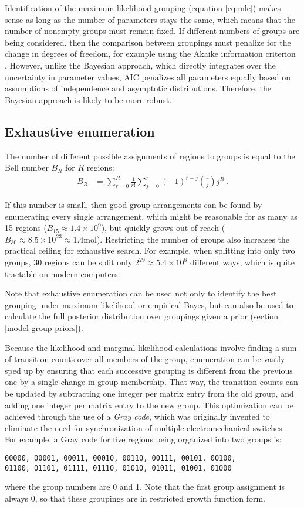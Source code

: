 \documentclass[12pt]{article}
\newcommand{\mol}{\mathrm{mol}}
\begin{document}
Identification of the maximum-likelihood grouping (equation \eqref{eq:mle}) makes sense as long as the number of parameters stays the same, which means that the number of nonempty groups must remain fixed. If different numbers of groups are being considered, then the comparison between groupings must penalize for the change in degrees of freedom, for example using the Akaike information criterion \cite{akaike1974}. However, unlike the Bayesian approach, which directly integrates over the uncertainty in parameter values, AIC penalizes all parameters equally based on assumptions of independence and asymptotic distributions. Therefore, the Bayesian approach is likely to be more robust.

\subsection{Exhaustive enumeration}
\label{enumeration}

The number of different possible assignments of regions to groups is equal to the Bell number $B_R$ for $R$ regions:
\begin{align}
B_R
&=
\sum_{r=0}^R \frac{1}{r!}\sum_{j=0}^{r}(-1)^{r-j} \binom{r}{j} j^R \, .
\end{align}

If this number is small, then good group arrangements can be found by enumerating every single arrangement, which might be reasonable for as many as 15 regions ($B_{15} \approx 1.4 \times 10^9$), but quickly grows out of reach ($B_{30} \approx 8.5 \times 10^{23} \approx 1.4 \mol$). Restricting the number of groups also increases the practical ceiling for exhaustive search. For example, when splitting into only two groups, 30 regions can be split only $2^{29} \approx 5.4 \times 10^8$ different ways, which is quite tractable on modern computers.

Note that exhaustive enumeration can be used not only to identify the best grouping under maximum likelihood or empirical Bayes, but can also be used to calculate the full posterior distribution over groupings given a prior (section \ref{model-group-priors}).

Because the likelihood and marginal likelihood calculations involve finding a sum of transition counts over all members of the group, enumeration can be vastly sped up by ensuring that each successive grouping is different from the previous one by a single change in group membership. That way, the transition counts can be updated by subtracting one integer per matrix entry from the old group, and adding one integer per matrix entry to the new group. This optimization can be achieved through the use of a \emph{Gray code}, which was originally invented to eliminate the need for synchronization of multiple electromechanical switches \cite{gray1953}. For example, a Gray code for five regions being organized into two groups is:
\begin{verbatim}
00000, 00001, 00011, 00010, 00110, 00111, 00101, 00100,
01100, 01101, 01111, 01110, 01010, 01011, 01001, 01000
\end{verbatim}
where the group numbers are 0 and 1. Note that the first group assignment is always 0, so that these groupings are in restricted growth function form.
\end{document}
